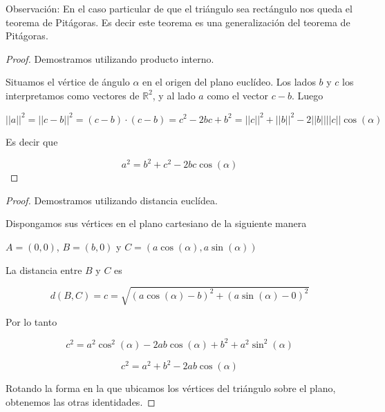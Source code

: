Observación: En el caso particular de que el triángulo sea rectángulo nos queda el teorema de Pitágoras.  Es decir este teorema es una generalización del teorema de Pitágoras.

\begin{proof}  Demostramos utilizando producto interno.

Situamos el vértice de ángulo $\alpha$ en el origen del plano euclídeo.  Los lados $b$ y $c$ los interpretamos como vectores de $\mathbb{R}^2$, y al lado $a$ como el vector $c-b$.  Luego

$ ||a||^2 = || c-b ||^2 = (c-b) \cdot (c-b) = c^2 - 2bc + b^2 = ||c||^2 + ||b||^2 - 2 ||b|| ||c|| \cos(\alpha) $

Es decir que

$$a^2 = b^2 + c^2 - 2 bc \cos(\alpha)$$

\end{proof}

\begin{proof}  Demostramos utilizando distancia euclídea.
	
Dispongamos sus vértices en el plano cartesiano de la siguiente manera

$A = (0,0)$, $B = (b, 0)$ y $C = (a \cos(\alpha), a \sin(\alpha))$

La distancia entre $B$ y $C$ es 

$$ d(B,C) = c = \sqrt{(a \cos(\alpha) - b)^2 + (a \sin(\alpha) - 0)^2 } $$

Por lo tanto

$$ c^2 = a^2 \cos^2(\alpha) - 2ab \cos(\alpha) + b^2 + a^2 \sin^2(\alpha)$$

$$ c^2 = a^2 + b^2 - 2ab \cos(\alpha) $$

Rotando la forma en la que ubicamos los vértices del triángulo sobre el plano, obtenemos las otras identidades.

\end{proof}

